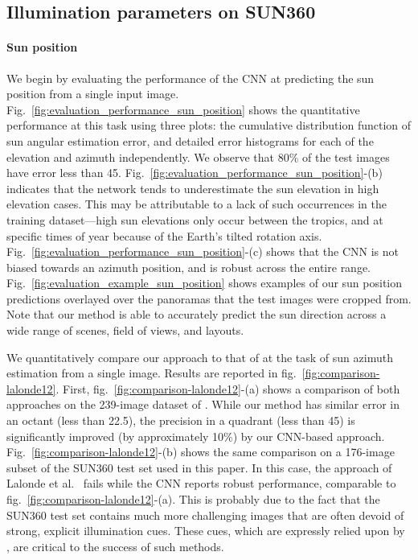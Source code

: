 \subsection{Illumination parameters on SUN360}

\paragraph{Sun position}

We begin by evaluating the performance of the CNN at predicting the sun position from a single input image. Fig.~\ref{fig:evaluation_performance_sun_position} shows the quantitative performance at this task using three plots: the cumulative distribution function of sun angular estimation error, and detailed error histograms for each of the elevation and azimuth independently. We observe that 80\% of the test images have error less than 45\degree. Fig.~\ref{fig:evaluation_performance_sun_position}-(b) indicates that the network tends to underestimate the sun elevation in high elevation cases. This may be attributable to a lack of such occurrences in the training dataset---high sun elevations only occur between the tropics, and at specific times of year because of the Earth's tilted rotation axis. Fig.~\ref{fig:evaluation_performance_sun_position}-(c) shows that the CNN is not biased towards an azimuth position, and is robust across the entire range. Fig.~\ref{fig:evaluation_example_sun_position} shows examples of our sun position predictions overlayed over the panoramas that the test images were cropped from. Note that our method is able to accurately predict the sun direction across a wide range of scenes, field of views, and layouts.

We quantitatively compare our approach to that of \cite{lalonde-ijcv-12} at the task of sun azimuth estimation from a single image. Results are reported in fig.~\ref{fig:comparison-lalonde12}. First, fig.~\ref{fig:comparison-lalonde12}-(a) shows a comparison of both approaches on the 239-image dataset of \cite{lalonde-ijcv-12}. While our method has similar error in an octant (less than 22.5\degree), the precision in a quadrant (less than 45\degree) is significantly improved (by approximately 10\%) by our CNN-based approach. Fig.~\ref{fig:comparison-lalonde12}-(b) shows the same comparison on a 176-image subset of the SUN360 test set used in this paper. In this case, the approach of Lalonde et al.~\cite{lalonde-ijcv-12} fails while the CNN reports robust performance, comparable to fig.~\ref{fig:comparison-lalonde12}-(a). This is probably due to the fact that the SUN360 test set contains much more challenging images that are often devoid of strong, explicit illumination cues. These cues, which are expressly relied upon by \cite{lalonde-ijcv-12}, are critical to the success of such methods.
\vspace{-1.5em}
